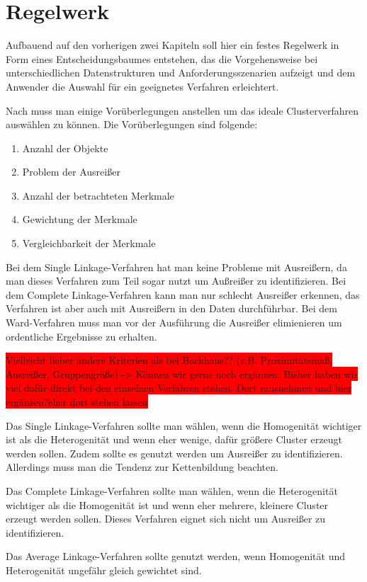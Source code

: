 \chapter{Regelwerk}

Aufbauend auf den vorherigen zwei Kapiteln soll hier ein festes Regelwerk in Form eines Entscheidungsbaumes entstehen, das die Vorgehensweise bei unterschiedlichen Datenstrukturen und Anforderungsszenarien aufzeigt und dem Anwender die Auswahl für ein geeignetes Verfahren erleichtert.

Nach \citet[S. 510]{Backhaus.2016} muss man einige Vorüberlegungen anstellen um das ideale Clusterverfahren auswählen zu können. Die Vorüberlegungen sind folgende:
\begin{enumerate}
    \item Anzahl der Objekte
    \item Problem der Ausreißer
    \item Anzahl der betrachteten Merkmale
    \item Gewichtung der Merkmale
    \item Vergleichbarkeit der Merkmale
\end{enumerate}



Bei dem Single Linkage-Verfahren hat man keine Probleme mit Ausreißern, da man dieses Verfahren zum Teil sogar nutzt um Außreißer zu identifizieren. Bei dem Complete Linkage-Verfahren kann man nur schlecht Ausreißer erkennen, das Verfahren ist aber auch mit Ausreißern in den Daten durchführbar. Bei dem Ward-Verfahren muss man vor der Ausführung die Ausreißer elimienieren um ordentliche Ergebnisse zu erhalten.

\colorbox{red}{Vielleicht lieber andere Kriterien als bei Backhaus?? (z.B. Proximitätsmaß, Ausreißer, Gruppengröße) -> Können wir gerne noch ergänzen. Bisher haben wir viel dafür direkt bei den einzelnen Verfahren stehen. Dort rausnehmen und hier ergänzen?eher dort stehen lassen}

Das Single Linkage-Verfahren sollte man wählen, wenn die Homogenität wichtiger ist als die Heterogenität und wenn eher wenige, dafür größere Cluster erzeugt werden sollen. Zudem sollte es genutzt werden um Ausreißer zu identifizieren. Allerdings muss man die Tendenz zur Kettenbildung beachten.

Das Complete Linkage-Verfahren sollte man wählen, wenn die Heterogenität wichtiger als die Homogenität ist und wenn eher mehrere, kleinere Cluster erzeugt werden sollen. Dieses Verfahren eignet sich nicht um Ausreißer zu identifizieren.

Das Average Linkage-Verfahren sollte genutzt werden, wenn Homogenität und Heterogenität ungefähr gleich gewichtet sind.
